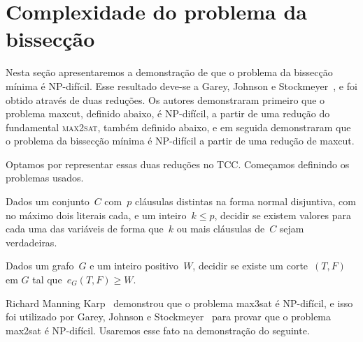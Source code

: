 \section {Complexidade do problema da bissecção}

	Nesta seção apresentaremos a demonstração de que o problema 
	da bissecção mínima é NP-difícil.
	Esse resultado deve-se a Garey, Johnson e Stockmeyer~\cite{GareyJS76},
	e foi obtido através de duas reduções.
	Os autores demonstraram primeiro que o problema {\sc maxcut},
	definido abaixo, é NP-difícil, a partir de uma redução do
	fundamental \textsc {max2sat}, também definido abaixo, e em seguida
	demonstraram que o problema da bissecção mínima é NP-difícil
	a partir de uma redução de {\sc maxcut}.

	Optamos por representar essas duas reduções no TCC.
	Começamos definindo os problemas usados.



	\medskip

	\begin{prob}
		Dados um conjunto~$C$ com~$p$ cláusulas distintas na forma 
		normal disjuntiva, com no máximo
		dois literais cada, e um inteiro~${k\le p}$,
		decidir se existem valores para cada uma das variáveis de forma
		que~$k$ ou mais cláusulas de~$C$ sejam verdadeiras.

	\end{prob}

	\medskip

	\begin{prob}
		Dados um grafo~${G}$
		e um inteiro positivo~${W}$, decidir se existe um
		corte~$(T,F)$ em $G$ tal 
		que~${e_G(T,F)\ge W}$.
		
	\end{prob}


	Richard Manning Karp~\cite{Kar72} demonstrou que o problema 
	{\sc max3sat} é NP-difícil,
	e isso foi utilizado por Garey, 
	Johnson e Stockmeyer~\cite{GareyJS76} 
	para provar que 
	o problema {\sc max2sat} é NP-difícil.
	Usaremos esse fato na demonstração do seguinte.


